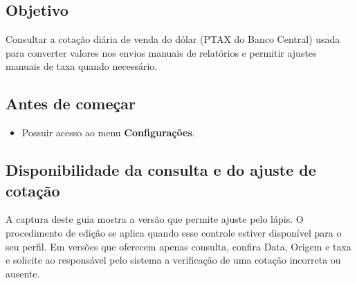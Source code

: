 \subsection*{Objetivo}

Consultar a cotação diária de venda do dólar (PTAX do Banco Central) usada para converter valores nos envios manuais de relatórios e permitir ajustes manuais de taxa quando necessário.\par

\subsection*{Antes de começar}

\begin{itemize}
\item Possuir acesso ao menu \textbf{Configurações}.
\end{itemize}


\Needspace{140pt}
\subsection*{Disponibilidade da consulta e do ajuste de cotação}


A captura deste guia mostra a versão que permite ajuste pelo lápis. O procedimento
de edição se aplica quando esse controle estiver disponível para o seu perfil.
Em versões que oferecem apenas consulta, confira Data, Origem e taxa e solicite
ao responsável pelo sistema a verificação de uma cotação incorreta ou ausente.

